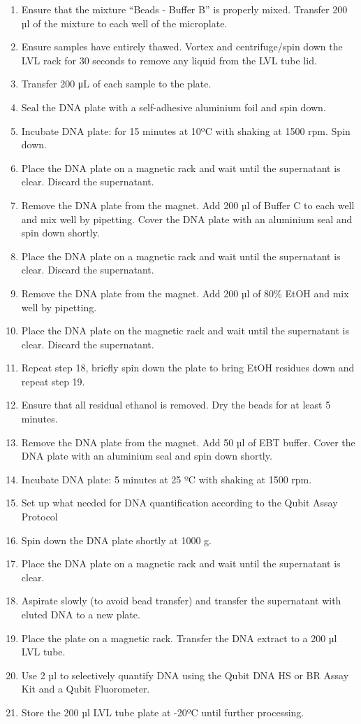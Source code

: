 \documentclass[
]{book}
\providecommand{\tightlist}{%
  \setlength{\itemsep}{0pt}\setlength{\parskip}{0pt}}
\begin{document}
\begin{enumerate}
\def\labelenumi{\arabic{enumi}.}
\tightlist
\item
  Ensure that the mixture ``Beads - Buffer B'' is properly mixed. Transfer 200 µl of the mixture to each well of the microplate.
\item
  Ensure samples have entirely thawed. Vortex and centrifuge/spin down the LVL rack for 30 seconds to remove any liquid from the LVL tube lid.
\item
  Transfer 200 μL of each sample to the plate.
\item
  Seal the DNA plate with a self-adhesive aluminium foil and spin down.
\item
  Incubate DNA plate: for 15 minutes at 10ºC with shaking at 1500 rpm. Spin down.
\item
  Place the DNA plate on a magnetic rack and wait until the supernatant is clear. Discard the supernatant.
\item
  Remove the DNA plate from the magnet. Add 200 µl of Buffer C to each well and mix well by pipetting. Cover the DNA plate with an aluminium seal and spin down shortly.
\item
  Place the DNA plate on a magnetic rack and wait until the supernatant is clear. Discard the supernatant.
\item
  Remove the DNA plate from the magnet. Add 200 µl of 80\% EtOH and mix well by pipetting.
\item
  Place the DNA plate on the magnetic rack and wait until the supernatant is clear. Discard the supernatant.
\item
  Repeat step 18, briefly spin down the plate to bring EtOH residues down and repeat step 19.
\item
  Ensure that all residual ethanol is removed. Dry the beads for at least 5 minutes.
\item
  Remove the DNA plate from the magnet. Add 50 µl of EBT buffer. Cover the DNA plate with an aluminium seal and spin down shortly.
\item
  Incubate DNA plate: 5 minutes at 25 ºC with shaking at 1500 rpm.
\item
  Set up what needed for DNA quantification according to the Qubit Assay Protocol
\item
  Spin down the DNA plate shortly at 1000 g.
\item
  Place the DNA plate on a magnetic rack and wait until the supernatant is clear.
\item
  Aspirate slowly (to avoid bead transfer) and transfer the supernatant with eluted DNA to a new plate.
\item
  Place the plate on a magnetic rack. Transfer the DNA extract to a 200 µl LVL tube.
\item
  Use 2 µl to selectively quantify DNA using the Qubit DNA HS or BR Assay Kit and a Qubit Fluorometer.
\item
  Store the 200 µl LVL tube plate at -20ºC until further processing.
\end{enumerate}
\end{document}
